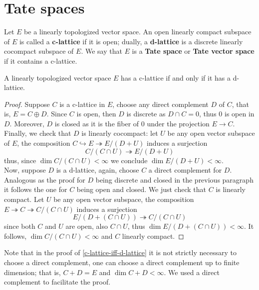 \section{Tate spaces}
\begin{definition}\label{tate-vector-space}
	Let $E$ be a linearly topologized vector space. An open linearly compact subspace of $E$ is called a \textbf{c-lattice} if it is open; dually, a \textbf{d-lattice} is a discrete linearly cocompact subspace of $E$. We say that $E$ is a \textbf{Tate space} or \textbf{Tate vector space} if it contains a c-lattice.
\end{definition}
\begin{proposition}\label{c-lattice-iff-d-lattice}
	A linearly topologized vector space $E$ has a c-lattice if and only if it has a d-lattice. 
\end{proposition}
\begin{proof}
	Suppose $C$ is a c-lattice in $E$, choose any direct complement $D$ of $C$, that is, $E = C \oplus D$. Since $C$ is open, then $D$ is discrete as $D\cap C = 0$, thus ${0}$ is open in $D$. Moreover, $D$ is closed as it is the fiber of $0$ under the projection $E \to C$. Finally, we check that $D$ is linearly cocompact: let $U$ be any open vector subspace of $E$, the composition $C \hookrightarrow E \twoheadrightarrow E/(D+U)$ induces a surjection 
	\[
		C/(C \cap U) \twoheadrightarrow E/(D+U)
	\]
	thus, since $\dim C / (C \cap U) < \infty$ we conclude $\dim E/(D+U) < \infty$. \\
	Now, suppose $D$ is a d-lattice, again, choose $C$ a direct complement for $D$. Analogous as the proof for $D$ being discrete and closed in the previous paragraph it follows the one for $C$ being open and closed. We just check that $C$ is linearly compact. Let $U$ be any open vector subspace, the composition $E \twoheadrightarrow C \twoheadrightarrow C/(C \cap U)$ induces a surjection
	 \[
	 	E/(D + (C \cap U)) \twoheadrightarrow C/(C \cap U)
	 \]
	 since both $C$ and $U$ are open, also $C\cap U$, thus $\dim E/(D + (C \cap U)) < \infty$. It follows, $\dim C/(C \cap U) < \infty$ and $C$ linearly compact.  
\end{proof}
\begin{remark}\label{up-to-finite-dimension}
	Note that in the proof of \cref{c-lattice-iff-d-lattice} it is not strictly necessary to choose a direct complement, one can choose a direct complement up to finite dimension; that is, $C + D = E$ and $\dim C + D < \infty$. We used a direct complement to facilitate the proof.
\end{remark}
